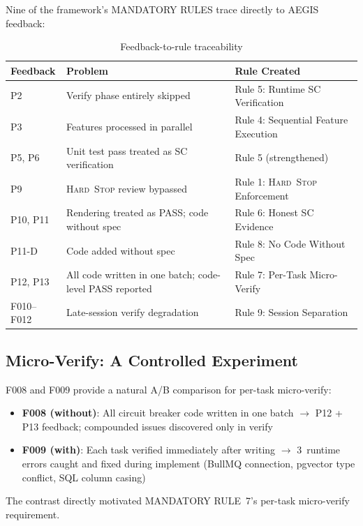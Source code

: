 \documentclass[11pt,a4paper,openright,twoside]{report}
\newcommand{\hardstop}{\textsc{Hard~Stop}}
\begin{document}
Nine of the framework's MANDATORY RULES trace directly to AEGIS feedback:

\begin{table}[H]
\centering
\caption{Feedback-to-rule traceability}
\label{tab:aegis-rules}
\begin{tabularx}{\textwidth}{lXl}
\toprule
\textbf{Feedback} & \textbf{Problem} & \textbf{Rule Created} \\
\midrule
P2 & Verify phase entirely skipped & Rule 5: Runtime SC Verification \\
P3 & Features processed in parallel & Rule 4: Sequential Feature Execution \\
P5, P6 & Unit test pass treated as SC verification & Rule 5 (strengthened) \\
P9 & \hardstop{} review bypassed & Rule 1: \hardstop{} Enforcement \\
P10, P11 & Rendering treated as PASS; code without spec & Rule 6: Honest SC Evidence \\
P11-D & Code added without spec & Rule 8: No Code Without Spec \\
P12, P13 & All code written in one batch; code-level PASS reported & Rule 7: Per-Task Micro-Verify \\
F010--F012 & Late-session verify degradation & Rule 9: Session Separation \\
\bottomrule
\end{tabularx}
\end{table}

\subsection{Micro-Verify: A Controlled Experiment}

F008 and F009 provide a natural A/B comparison for per-task micro-verify:

\begin{itemize}[nosep]
  \item \textbf{F008 (without)}: All circuit breaker code written in one batch $\to$ P12 + P13 feedback; compounded issues discovered only in verify
  \item \textbf{F009 (with)}: Each task verified immediately after writing $\to$ 3~runtime errors caught and fixed during implement (BullMQ connection, pgvector type conflict, SQL column casing)
\end{itemize}

The contrast directly motivated MANDATORY RULE~7's per-task micro-verify requirement.
\end{document}
